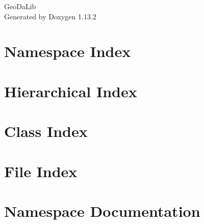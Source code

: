 \documentclass[twoside]{book}
\newcommand{\+}{\discretionary{\mbox{\scriptsize$\hookleftarrow$}}{}{}}
\newcommand{\clearemptydoublepage}{%
    \newpage{\pagestyle{empty}\cleardoublepage}%
  }
\begin{document}
  \raggedbottom
    \hypersetup{pageanchor=false,
                bookmarksnumbered=true,
                pdfencoding=unicode
               }
  \begin{titlepage}
  \vspace*{7cm}
  \begin{center}%
  {\Large Geo\+Da\+Lib}\\
  \vspace*{1cm}
  {\large Generated by Doxygen 1.13.2}\\
  \end{center}
  \end{titlepage}
  \clearemptydoublepage
  \tableofcontents
  \clearemptydoublepage
  \hypersetup{pageanchor=true}
\chapter{Namespace Index}

\chapter{Hierarchical Index}

\chapter{Class Index}

\chapter{File Index}

\chapter{Namespace Documentation}


\end{document}
